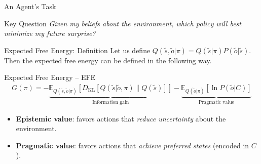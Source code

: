 \documentclass[aspectratio=1610, english]{beamer}
\begin{document}
\begin{frame}{An Agent's Task} 
  \begin{block}{Key Question}
    \centering
    \emph{Given my beliefs about the environment, which policy will best minimize my future surprise?}
  \end{block}
\end{frame}

\begin{frame}{Expected Free Energy: Definition}
    Let us define $Q(\tilde{s}, \tilde{o} | \pi)=Q(\tilde{s} | \pi) P(\tilde{o} | \tilde{s})$. Then the expected free energy can be defined in the following way.
    \begin{block}{Expected Free Energy -- EFE}
        \begin{align*}
            G(\pi)=-\underbrace{\mathbb{E}_{Q(\tilde{s}, \tilde{o} | \pi)}[D_{\mathrm{KL}}[Q(\tilde{s}| \tilde{o}, \pi) \| Q(\tilde{s})]]}_{\text{Information gain}} - \underbrace{\mathbb{E}_{Q(\tilde{o}|\pi)}[\ln P(\tilde{o}|C)]}_{\text{Pragmatic value}}
        \end{align*}
    \end{block}

    \begin{itemize}
        \item \textbf{Epistemic value}: favors actions that \emph{reduce uncertainty} about the environment.
        \item \textbf{Pragmatic value}: favors actions that \emph{achieve preferred states} (encoded in \(C\)).
    \end{itemize}
\end{frame}
\end{document}
